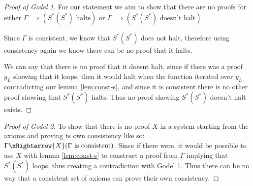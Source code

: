 \begin{proof}[Proof of Godel 1]
For our statement we aim to show that there are no proofs for either $\Gamma \implies (S^*(S^*) \text{ halts})$ or $\Gamma \implies (S^*(S^*) \text{ doesn't halt})$

Since $\Gamma$ is consistent, we know that $S^*(S^*)$ does not halt, therefore using consistency again we know there can be no proof that it halts. 

We can say that there is no proof that it doesnt halt, since if there was a proof $y_L$ showing that it loops, then it would halt when the function iterated over $y_L$ contradicting our lemma \ref{lem:const-s}, and since it is consistent there is no other proof showing that $S^*(S^*)$ halts.  Thus no proof showing $S^*(S^*)$ doesn't halt exists.
\end{proof}

\begin{proof}[Proof of Godel 2]
To show that there is no proof $X$ in a system starting from the axioms and proving ts own consistency like so: $\Gamma \xRightarrow{X} (\Gamma \text{ is consistent})$. Since if there were, it would be possible to use $X$ with lemma \ref{lem:const-s} to construct a proof from $\Gamma$ implying that $S^*(S^*)$ loops, thus creating a contradiction with Godel 1. Thus there can be no way that a consistent set of axioms can prove their own consistency.
\end{proof}

